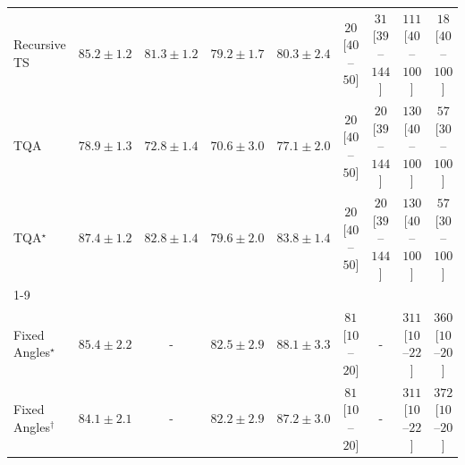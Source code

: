 \begin{tabular}{l|cccc|cccc|}
Recursive TS & {\cellcolor[HTML]{005B32}} \color[HTML]{F1F1F1} $85.2\pm 1.2$ & {\cellcolor[HTML]{12763D}} \color[HTML]{F1F1F1} $81.3\pm 1.2$ & {\cellcolor[HTML]{228343}} \color[HTML]{F1F1F1} $79.2\pm 1.7$ & {\cellcolor[HTML]{1A7D40}} \color[HTML]{F1F1F1} $80.3\pm 2.4$ & {\cellcolor[HTML]{FFF4F0}} \color[HTML]{000000} $20$ [$40$--$50$] & {\cellcolor[HTML]{FFF2EE}} \color[HTML]{000000} $31$ [$39$--$144$] & {\cellcolor[HTML]{FDE0DD}} \color[HTML]{000000} $111$ [$40$--$100$] & {\cellcolor[HTML]{FFF5F1}} \color[HTML]{000000} $18$ [$40$--$100$] \\
TQA & {\cellcolor[HTML]{258745}} \color[HTML]{F1F1F1} $78.9\pm 1.3$ & {\cellcolor[HTML]{5AB76A}} \color[HTML]{F1F1F1} $72.8\pm 1.4$ & {\cellcolor[HTML]{74C477}} \color[HTML]{000000} $70.6\pm 3.0$ & {\cellcolor[HTML]{31974F}} \color[HTML]{F1F1F1} $77.1\pm 2.0$ & {\cellcolor[HTML]{FFF4F0}} \color[HTML]{000000} $20$ [$40$--$50$] & {\cellcolor[HTML]{FFF4F0}} \color[HTML]{000000} $20$ [$39$--$144$] & {\cellcolor[HTML]{FDDBD7}} \color[HTML]{000000} $130$ [$40$--$100$] & {\cellcolor[HTML]{FEECE9}} \color[HTML]{000000} $57$ [$30$--$100$] \\
TQA$^\star$ & {\cellcolor[HTML]{004A2B}} \color[HTML]{F1F1F1} $87.4\pm 1.2$ & {\cellcolor[HTML]{076D39}} \color[HTML]{F1F1F1} $82.8\pm 1.4$ & {\cellcolor[HTML]{208242}} \color[HTML]{F1F1F1} $79.6\pm 2.0$ & {\cellcolor[HTML]{006636}} \color[HTML]{F1F1F1} $83.8\pm 1.4$ & {\cellcolor[HTML]{FFF4F0}} \color[HTML]{000000} $20$ [$40$--$50$] & {\cellcolor[HTML]{FFF4F0}} \color[HTML]{000000} $20$ [$39$--$144$] & {\cellcolor[HTML]{FDDBD7}} \color[HTML]{000000} $130$ [$40$--$100$] & {\cellcolor[HTML]{FEECE9}} \color[HTML]{000000} $57$ [$30$--$100$] \\
\cline{1-9}
\multicolumn{9}{c}{\rule{0pt}{8pt}SV} \\
\midrule
Fixed Angles$^\star$ & {\cellcolor[HTML]{034C78}} \color[HTML]{F1F1F1} $85.4\pm 2.2$ & {\cellcolor[HTML]{000000}} \color[HTML]{F1F1F1} {\cellcolor{white}} \color{black} - & {\cellcolor[HTML]{046096}} \color[HTML]{F1F1F1} $82.5\pm 2.9$ & {\cellcolor[HTML]{023858}} \color[HTML]{F1F1F1} $88.1\pm 3.3$ & {\cellcolor[HTML]{FEE6E3}} \color[HTML]{000000} $81$ [$10$--$20$] & {\cellcolor[HTML]{000000}} \color[HTML]{F1F1F1} {\cellcolor{white}} \color{black} - & {\cellcolor[HTML]{FAA1B6}} \color[HTML]{000000} $311$ [$10$--$22$] & {\cellcolor[HTML]{F986AC}} \color[HTML]{F1F1F1} $360$ [$10$--$20$] \\
Fixed Angles$^\dagger$ & {\cellcolor[HTML]{045687}} \color[HTML]{F1F1F1} $84.1\pm 2.1$ & {\cellcolor[HTML]{000000}} \color[HTML]{F1F1F1} {\cellcolor{white}} \color{black} - & {\cellcolor[HTML]{046198}} \color[HTML]{F1F1F1} $82.2\pm 2.9$ & {\cellcolor[HTML]{023E62}} \color[HTML]{F1F1F1} $87.2\pm 3.0$ & {\cellcolor[HTML]{FEE6E3}} \color[HTML]{000000} $81$ [$10$--$20$] & {\cellcolor[HTML]{000000}} \color[HTML]{F1F1F1} {\cellcolor{white}} \color{black} - & {\cellcolor[HTML]{FAA1B6}} \color[HTML]{000000} $311$ [$10$--$22$] & {\cellcolor[HTML]{F881AA}} \color[HTML]{F1F1F1} $372$ [$10$--$20$] \\

\end{tabular}
